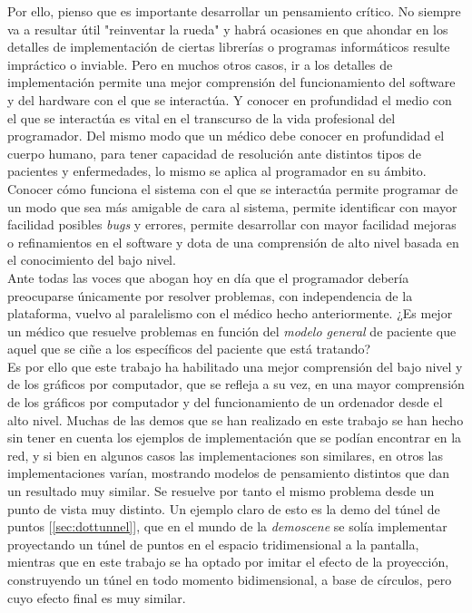 Por ello, pienso que es importante desarrollar un pensamiento crítico. No siempre va a resultar útil "reinventar la rueda" y habrá ocasiones en que ahondar en los detalles de implementación de ciertas librerías o programas informáticos resulte impráctico o inviable. Pero en muchos otros casos, ir a los detalles de implementación permite una mejor comprensión del funcionamiento del software y del hardware con el que se interactúa. Y conocer en profundidad el medio con el que se interactúa es vital en el transcurso de la vida profesional del programador. Del mismo modo que un médico debe conocer en profundidad el cuerpo humano, para tener capacidad de resolución ante distintos tipos de pacientes y enfermedades, lo mismo se aplica al programador en su ámbito. Conocer cómo funciona el sistema con el que se interactúa permite programar de un modo que sea más amigable de cara al sistema, permite identificar con mayor facilidad posibles \emph{bugs} y errores, permite desarrollar con mayor facilidad mejoras o refinamientos en el software y dota de una comprensión de alto nivel basada en el conocimiento del bajo nivel.\\

Ante todas las voces que abogan hoy en día que el programador debería preocuparse únicamente por resolver problemas, con independencia de la plataforma, vuelvo al paralelismo con el médico hecho anteriormente. ¿Es mejor un médico que resuelve problemas en función del \emph{modelo general} de paciente que aquel que se ciñe a los específicos del paciente que está tratando?\\

Es por ello que este trabajo ha habilitado una mejor comprensión del bajo nivel y de los gráficos por computador, que se refleja a su vez, en una mayor comprensión de los gráficos por computador y del funcionamiento de un ordenador desde el alto nivel. Muchas de las demos que se han realizado en este trabajo se han hecho sin tener en cuenta los ejemplos de implementación que se podían encontrar en la red, y si bien en algunos casos las implementaciones son similares, en otros las implementaciones varían, mostrando modelos de pensamiento distintos que dan un resultado muy similar. Se resuelve por tanto el mismo problema desde un punto de vista muy distinto. Un ejemplo claro de esto es la demo del túnel de puntos [\ref{sec:dottunnel}], que en el mundo de la \emph{demoscene} se solía implementar proyectando un túnel de puntos en el espacio tridimensional a la pantalla, mientras que en este trabajo se ha optado por imitar el efecto de la proyección, construyendo un túnel en todo momento bidimensional, a base de círculos, pero cuyo efecto final es muy similar.\\


